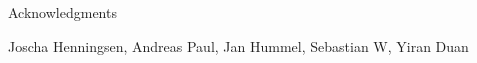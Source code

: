 \thispagestyle{empty}

\vspace*{20mm}

\begin{center}
    { Acknowledgments}
\end{center}

\vspace{10mm}

Joscha Henningsen, Andreas Paul, Jan Hummel, Sebastian W, Yiran Duan 

\cleardoublepage{}
